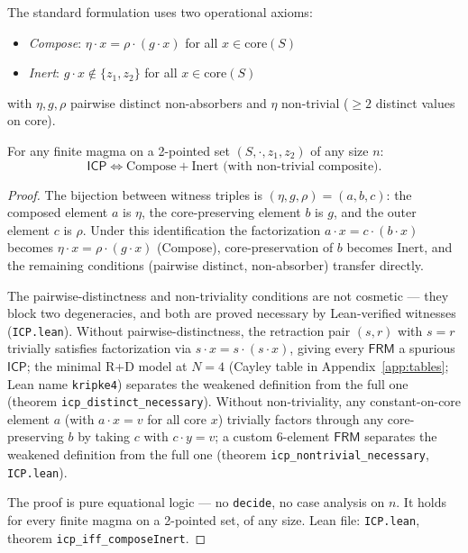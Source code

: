 \documentclass[sigconf,screen,review,anonymous]{acmart}
\newcommand{\dotop}{\cdot}
\newcommand{\FRM}{\textsf{FRM}}
\newcommand{\ICP}{\textsf{ICP}}
\newcommand{\core}{\mathrm{core}}
\theoremstyle{remark}
\begin{document}
The standard formulation uses two operational axioms:
\begin{itemize}
  \item \emph{Compose}: $\eta \dotop x = \rho \dotop (g \dotop x)$ for all $x \in \core(S)$
  \item \emph{Inert}: $g \dotop x \notin \{z_1, z_2\}$ for all $x \in \core(S)$
\end{itemize}
with $\eta, g, \rho$ pairwise distinct non-absorbers and $\eta$ non-trivial ($\geq 2$ distinct values on core).

\begin{theorem}[$\ICP$ Equivalence]
\label{thm:icp-equiv}
For any finite magma on a 2-pointed set $(S, \dotop, z_1, z_2)$ of any size $n$:
\[
\ICP \iff \text{Compose} + \text{Inert} \text{ (with non-trivial composite)}.
\]
\end{theorem}

\begin{proof}
The bijection between witness triples is $(\eta, g, \rho) = (a, b, c)$: the composed element $a$ is $\eta$, the core-preserving element $b$ is $g$, and the outer element $c$ is $\rho$. Under this identification the factorization $a \dotop x = c \dotop (b \dotop x)$ becomes $\eta \dotop x = \rho \dotop (g \dotop x)$ (Compose), core-preservation of $b$ becomes Inert, and the remaining conditions (pairwise distinct, non-absorber) transfer directly.

The pairwise-distinctness and non-triviality conditions are not cosmetic --- they block two degeneracies, and both are proved necessary by Lean-verified witnesses (\texttt{ICP.lean}). Without pairwise-distinctness, the retraction pair $(s, r)$ with $s = r$ trivially satisfies factorization via $s \dotop x = s \dotop (s \dotop x)$, giving every $\FRM$ a spurious $\ICP$; the minimal R{+}D model at $N\!=\!4$ (Cayley table in Appendix~\ref{app:tables}; Lean name \texttt{kripke4}) separates the weakened definition from the full one (theorem \texttt{icp\_distinct\_necessary}). Without non-triviality, any constant-on-core element $a$ (with $a \dotop x = v$ for all core $x$) trivially factors through any core-preserving $b$ by taking $c$ with $c \dotop y = v$; a custom 6-element $\FRM$ separates the weakened definition from the full one (theorem \texttt{icp\_nontrivial\_necessary}, \texttt{ICP.lean}).

The proof is pure equational logic --- no \texttt{decide}, no case analysis on $n$. It holds for every finite magma on a 2-pointed set, of any size. Lean file: \texttt{ICP.lean}, theorem \texttt{icp\_iff\_composeInert}.
\end{proof}
\end{document}
